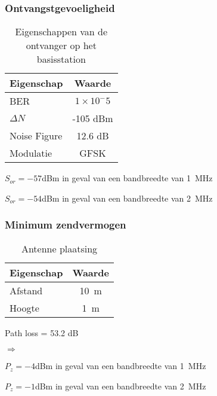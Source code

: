 \begin{frame}
    \frametitle{Ontvangstgevoeligheid}

    \begin{table}
        \centering
        \begin{tabular}{l|c}
            Eigenschap & Waarde \\\hline
            BER & $1\times10^-5$ \\
            $\Delta N$ & -105 dBm \\
            Noise Figure & 12.6 dB \\
            Modulatie & GFSK \\
        \end{tabular}
        \caption{Eigenschappen van de ontvanger op het basisstation}
    \end{table}

    \pause 

    $S_{or}=-57$dBm in geval van een bandbreedte van \qty{1}{\mega\hertz}

    $S_{or}=-54$dBm in geval van een bandbreedte van \qty{2}{\mega\hertz}

\end{frame}

\begin{frame}
    \frametitle{Minimum zendvermogen}

    \begin{table}
        \centering
        \begin{tabular}{l|c}
            Eigenschap & Waarde \\\hline
            Afstand & \qty{10}{\meter} \\
            Hoogte & \qty{1}{\meter} \\
        \end{tabular}
        \caption{Antenne plaatsing}
    \end{table}

    Path loss = 53.2 dB

    \pause

    $\Rightarrow$

    $P_{z}=-4$dBm in geval van een bandbreedte van \qty{1}{\mega\hertz}

    $P_{z}=-1$dBm in geval van een bandbreedte van \qty{2}{\mega\hertz}
\end{frame}

